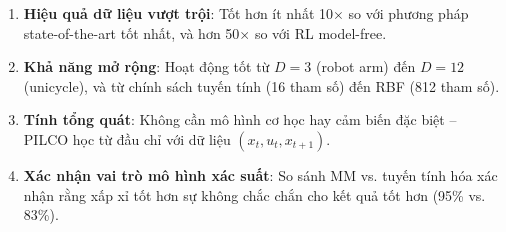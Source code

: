 \begin{enumerate}
    \item \textbf{Hiệu quả dữ liệu vượt trội}: Tốt hơn ít nhất 10$\times$ so với phương pháp state-of-the-art tốt nhất, và hơn 50$\times$ so với RL model-free.
    
    \item \textbf{Khả năng mở rộng}: Hoạt động tốt từ $D=3$ (robot arm) đến $D=12$ (unicycle), và từ chính sách tuyến tính (16 tham số) đến RBF (812 tham số).
    
    \item \textbf{Tính tổng quát}: Không cần mô hình cơ học hay cảm biến đặc biệt -- PILCO học từ đầu chỉ với dữ liệu $(x_t, u_t, x_{t+1})$.
    
    \item \textbf{Xác nhận vai trò mô hình xác suất}: So sánh MM vs. tuyến tính hóa xác nhận rằng xấp xỉ tốt hơn sự không chắc chắn cho kết quả tốt hơn (95\% vs. 83\%).
\end{enumerate}
\medskip
